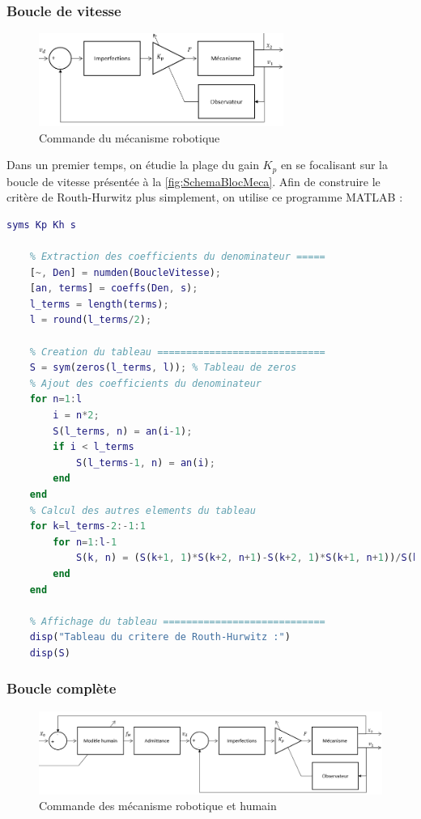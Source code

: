 \documentclass[a4paper,12pt]{article}
\begin{document}
\subsubsection{Boucle de vitesse}
\begin{figure}[h!]
    \centering
    \includegraphics[width=8cm]{./img/cmd_meca_rob_hum_vit.png}
    \caption{Commande du mécanisme robotique}
    \label{fig:SchemaBlocMeca}
\end{figure}
Dans un premier temps, on étudie la plage du gain $K_p$ en se focalisant sur la boucle de vitesse présentée à la \hyperref[fig:SchemaBlocMeca]{\autoref{fig:SchemaBlocMeca}}. Afin de construire le critère de Routh-Hurwitz plus simplement, on utilise ce programme MATLAB : \\
\newpage
\begin{lstlisting}[language=Matlab]
    syms Kp Kh s

    % Extraction des coefficients du denominateur =====
    [~, Den] = numden(BoucleVitesse);
    [an, terms] = coeffs(Den, s);
    l_terms = length(terms);
    l = round(l_terms/2);

    % Creation du tableau =============================
    S = sym(zeros(l_terms, l)); % Tableau de zeros
    % Ajout des coefficients du denominateur
    for n=1:l
        i = n*2;
        S(l_terms, n) = an(i-1);
        if i < l_terms
            S(l_terms-1, n) = an(i);
        end
    end
    % Calcul des autres elements du tableau
    for k=l_terms-2:-1:1
        for n=1:l-1
            S(k, n) = (S(k+1, 1)*S(k+2, n+1)-S(k+2, 1)*S(k+1, n+1))/S(k+1, 1);
        end
    end

    % Affichage du tableau ============================
    disp("Tableau du critere de Routh-Hurwitz :")
    disp(S)
\end{lstlisting}

\subsubsection{Boucle complète}
\begin{figure}[h!]
    \centering
    \includegraphics[width=14cm]{./img/cmd_meca_rob_hum.png}
    \caption{Commande des mécanisme robotique et humain}
    \label{fig:SchemaBlocComplet}
\end{figure}
\end{document}
